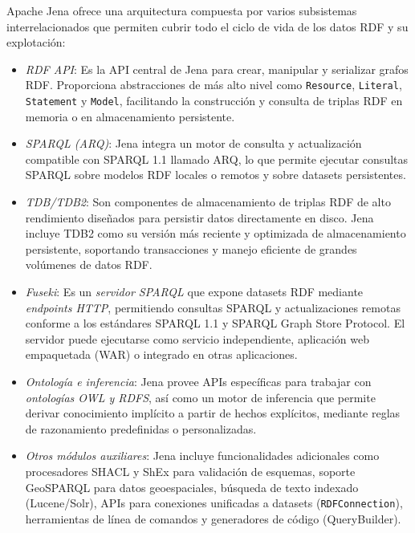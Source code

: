 \documentclass{article}
\begin{document}
Apache Jena ofrece una arquitectura compuesta por varios subsistemas interrelacionados que permiten cubrir todo el ciclo de vida de los datos RDF y su explotación:

\begin{itemize}
    \item \textit{RDF API}: Es la API central de Jena para crear, manipular y serializar grafos RDF. Proporciona abstracciones de más alto nivel como \texttt{Resource}, \texttt{Literal}, \texttt{Statement} y \texttt{Model}, facilitando la construcción y consulta de triplas RDF en memoria o en almacenamiento persistente.
    \item \textit{SPARQL (ARQ)}: Jena integra un motor de consulta y actualización compatible con SPARQL 1.1 llamado ARQ, lo que permite ejecutar consultas SPARQL sobre modelos RDF locales o remotos y sobre datasets persistentes.
    \item \textit{TDB/TDB2}: Son componentes de almacenamiento de triplas RDF de alto rendimiento diseñados para persistir datos directamente en disco. Jena incluye TDB2 como su versión más reciente y optimizada de almacenamiento persistente, soportando transacciones y manejo eficiente de grandes volúmenes de datos RDF.

    \item \textit{Fuseki}: Es un \textit{servidor SPARQL} que expone datasets RDF mediante \textit{endpoints HTTP}, permitiendo consultas SPARQL y actualizaciones remotas conforme a los estándares SPARQL 1.1 y SPARQL Graph Store Protocol. El servidor puede ejecutarse como servicio independiente, aplicación web empaquetada (WAR) o integrado en otras aplicaciones.

    \item \textit{Ontología e inferencia}: Jena provee APIs específicas para trabajar con \textit{ontologías OWL y RDFS}, así como un motor de inferencia que permite derivar conocimiento implícito a partir de hechos explícitos, mediante reglas de razonamiento predefinidas o personalizadas.

    \item \textit{Otros módulos auxiliares}: Jena incluye funcionalidades adicionales como procesadores SHACL y ShEx para validación de esquemas, soporte GeoSPARQL para datos geoespaciales, búsqueda de texto indexado (Lucene/Solr), APIs para conexiones unificadas a datasets (\texttt{RDFConnection}), herramientas de línea de comandos y generadores de código (QueryBuilder).
\end{itemize}
\end{document}
